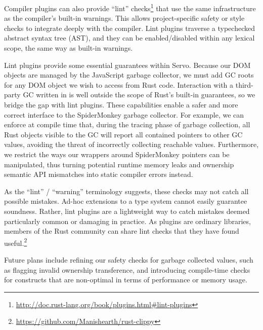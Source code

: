 Compiler plugins can also provide ``lint'' checks\footnote{\url{http://doc.rust-lang.org/book/plugins.html#lint-plugins}} that use the same infrastructure as the compiler's built-in warnings. This allows project-specific safety or style checks to integrate deeply with the compiler. Lint plugins traverse a typechecked abstract syntax tree (AST), and they can be enabled/disabled within any lexical scope, the same way as built-in warnings.

Lint plugins provide some essential guarantees within Servo. Because our DOM objects are managed by the JavaScript garbage collector, we must add GC roots for any DOM object we wish to access from Rust code. Interaction with a third-party GC written in \Cplusplus{} is well outside the scope of Rust's built-in guarantees, so we bridge the gap with lint plugins. These capabilities enable a safer and more correct interface to the SpiderMonkey garbage collector. For example, we can enforce at compile time that, during the tracing phase of garbage collection, all Rust objects visible to the GC will report all contained pointers to other GC values, avoiding the threat of incorrectly collecting reachable values. Furthermore, we restrict the ways our wrappers around SpiderMonkey pointers can be manipulated, thus turning potential runtime memory leaks and ownership semantic API mismatches into static compiler errors instead.

As the ``lint'' / ``warning'' terminology suggests, these checks may not catch all possible mistakes. Ad-hoc extensions to a type system cannot easily guarantee soundness. Rather, lint plugins are a lightweight way to catch mistakes deemed particularly common or damaging in practice. As plugins are ordinary libraries, members of the Rust community can share lint checks that they have found useful.\footnote{\url{https://github.com/Manishearth/rust-clippy}}

Future plans include refining our safety checks for garbage collected values, such as flagging invalid ownership
transference, and introducing compile-time checks for constructs that are non-optimal in terms of performance or
memory usage.
